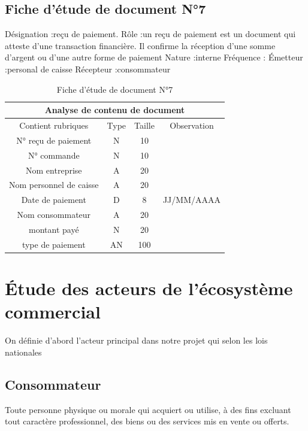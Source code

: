 \documentclass[edit,12pt,a4paper,ChapStyle,oneside,doubleinterligne]{report}
\begin{document}
\subsection{Fiche d’étude de document N°7}
Désignation :reçu de paiement.
\newline Rôle :un reçu de paiement est un document qui atteste d'une transaction financière. Il confirme la réception d'une somme d'argent ou d'une autre forme de paiement
\newline Nature :interne
\newline Fréquence :
\newline Émetteur :personal de caisse
\newline Récepteur :consommateur \cite{reçu}
\begin{table}[h!]
    \centering
    \begin{tabular}{|c|c|c|c|}
         \hline
\multicolumn{4}{|c|}{Analyse de contenu de document}\\
\hline
Contient rubriques & Type & Taille & Observation\\
\hline
 N° reçu de paiement & N & 10 & \\
 N° commande  & N & 10 & \\
 Nom entreprise & A & 20 & \\
 Nom personnel de caisse & A & 20 & \\
 Date de paiement & D & 8 & JJ/MM/AAAA \\
Nom consommateur & A & 20 & \\
montant payé & N & 20 & \\
type de paiement & AN & 100 & \\
\hline
    \end{tabular}
    \caption{Fiche d’étude de document N°7}
    \label{tab:7}
\end{table}
\section{Étude des acteurs de l'écosystème commercial}
On définie d’abord l’acteur principal dans notre projet qui selon les lois nationales
\subsection{Consommateur}
Toute personne physique ou morale qui acquiert ou utilise, à des fins excluant tout caractère professionnel, des biens ou des services mis en vente ou offerts\cite{Consommateur}.  
\end{document}
